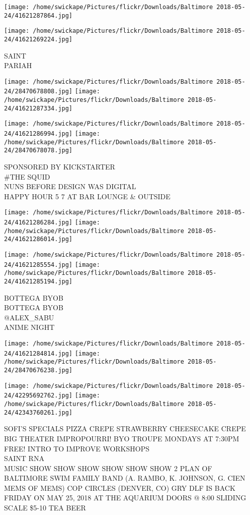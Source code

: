 \documentclass[10pt,letterpaper]{article}
\begin{document}
\texttt{[image: /home/swickape/Pictures/flickr/Downloads/Baltimore 2018-05-24/41621287864.jpg]}

\vspace{0.25in}
\texttt{[image: /home/swickape/Pictures/flickr/Downloads/Baltimore 2018-05-24/41621269224.jpg]}

SAINT\\
PARIAH
\pagebreak

\texttt{[image: /home/swickape/Pictures/flickr/Downloads/Baltimore 2018-05-24/28470678808.jpg]}
\texttt{[image: /home/swickape/Pictures/flickr/Downloads/Baltimore 2018-05-24/41621287334.jpg]}

\texttt{[image: /home/swickape/Pictures/flickr/Downloads/Baltimore 2018-05-24/41621286994.jpg]}
\texttt{[image: /home/swickape/Pictures/flickr/Downloads/Baltimore 2018-05-24/28470678078.jpg]}

SPONSORED BY KICKSTARTER\\
\#THE SQUID\\
NUNS BEFORE DESIGN WAS DIGITAL\\
HAPPY HOUR 5 7 AT BAR LOUNGE \& OUTSIDE
\pagebreak

\texttt{[image: /home/swickape/Pictures/flickr/Downloads/Baltimore 2018-05-24/41621286284.jpg]}
\texttt{[image: /home/swickape/Pictures/flickr/Downloads/Baltimore 2018-05-24/41621286014.jpg]}

\texttt{[image: /home/swickape/Pictures/flickr/Downloads/Baltimore 2018-05-24/41621285554.jpg]}
\texttt{[image: /home/swickape/Pictures/flickr/Downloads/Baltimore 2018-05-24/41621285194.jpg]}

BOTTEGA BYOB\\
BOTTEGA BYOB\\
@ALEX\_SABU\\
ANIME NIGHT
\pagebreak

\texttt{[image: /home/swickape/Pictures/flickr/Downloads/Baltimore 2018-05-24/41621284814.jpg]}
\texttt{[image: /home/swickape/Pictures/flickr/Downloads/Baltimore 2018-05-24/28470676238.jpg]}

\texttt{[image: /home/swickape/Pictures/flickr/Downloads/Baltimore 2018-05-24/42295692762.jpg]}
\texttt{[image: /home/swickape/Pictures/flickr/Downloads/Baltimore 2018-05-24/42343760261.jpg]}

SOFI'S SPECIALS PIZZA CREPE STRAWBERRY CHEESECAKE CREPE\\
BIG THEATER IMPROPOURRI! BYO TROUPE MONDAYS AT 7:30PM FREE! INTRO TO IMPROVE WORKSHOPS\\
SAINT RNA\\
MUSIC SHOW SHOW SHOW SHOW SHOW SHOW 2 PLAN OF BALTIMORE SWIM FAMILY BAND (A. RAMBO, K. JOHNSON, G. CIEN MEMS OF MEMS) COP CIRCLES (DENVER, CO) GRY DLF IS BACK FRIDAY ON MAY 25, 2018 AT THE AQUARIUM DOORS @ 8:00 SLIDING SCALE \$5{-}10 TEA BEER
\pagebreak
\end{document}
